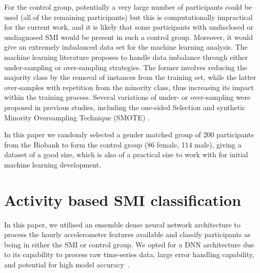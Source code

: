 \documentclass[letterpaper, 10pt, conference]{ieeeconf} %
\begin{document}
  For the control group, potentially a very large number of participants could be used (all of the remaining participants) but this is computationally impractical for the current work, and it is likely that some participants with undisclosed or undiagnosed SMI would be present in such a control group. Moreover, it would give an extremely imbalanced data set for the machine learning analysis. The machine learning literature proposes to handle data imbalance through either under-sampling or over-sampling strategies. The former involves reducing the majority class by the removal of instances from the training set, while the latter over-samples with repetition from the minority class, thus increasing its impact within the training process. Several variations of under- or over-sampling were proposed in previous studies, including the one-sided Selection and synthetic Minority Oversampling Technique (SMOTE) \cite{witten2016data}.
  
  In this paper we randomly selected a gender matched group of 200 participants from the Biobank to form the control group (86 female, 114 male), giving a dataset of a good size, which is also of a practical size to work with for initial machine learning development.


\section{Activity based SMI classification} \label{sec:classifier}
In this paper, we utilised an ensemble dense neural network architecture to process the hourly accelerometer features available and classify participants as being in either the SMI or control group. We opted for a DNN architecture due to its capability to process raw time-series data, large error handling capability, and potential for high model accuracy~\cite{RN90}. 
\end{document}
